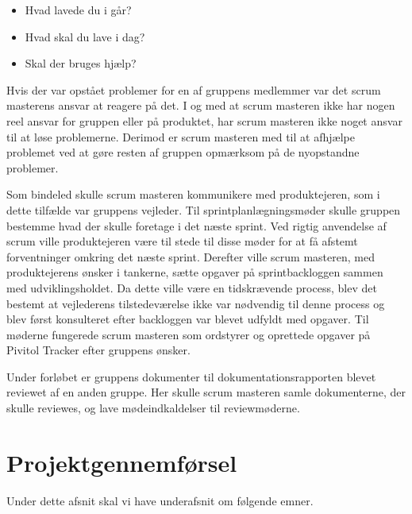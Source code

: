 \begin{itemize}
	\item Hvad lavede du i går?
	\item Hvad skal du lave i dag?
	\item Skal der bruges hjælp?
\end{itemize} 

Hvis der var opstået problemer for en af gruppens medlemmer var det scrum masterens ansvar at reagere på det. I og med at scrum masteren ikke har nogen reel ansvar for gruppen eller på produktet, har scrum masteren ikke noget ansvar til at løse problemerne. Derimod er scrum masteren med til at afhjælpe problemet ved at gøre resten af gruppen opmærksom på de nyopstandne problemer. 

Som bindeled skulle scrum masteren kommunikere med produktejeren, som i dette tilfælde var gruppens vejleder. Til sprintplanlægningsmøder skulle gruppen bestemme hvad der skulle foretage i det næste sprint. Ved rigtig anvendelse af scrum ville produktejeren være til stede til disse møder for at få afstemt forventninger omkring det næste sprint. Derefter ville scrum masteren, med produktejerens ønsker i tankerne, sætte opgaver på sprintbackloggen sammen med udviklingsholdet. Da dette ville være en tidskrævende process, blev det bestemt at vejlederens tilstedeværelse ikke var nødvendig til denne process og blev først konsulteret efter backloggen var blevet udfyldt med opgaver. Til møderne fungerede scrum masteren som ordstyrer og oprettede opgaver på Pivitol Tracker efter gruppens ønsker. \par 
Under forløbet er gruppens dokumenter til dokumentationsrapporten blevet reviewet af en anden gruppe. Her skulle scrum masteren samle dokumenterne, der skulle reviewes, og lave mødeindkaldelser til reviewmøderne.







\chapter{Projektgennemførsel}

Under dette afsnit skal vi have underafsnit om følgende emner.



